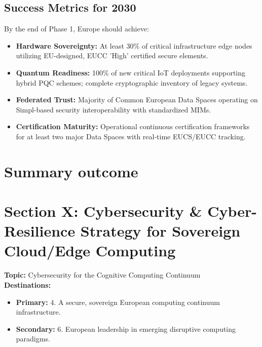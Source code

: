 \documentclass{ieeeaccess}
\begin{document}
\subsection*{Success Metrics for 2030}
By the end of Phase 1, Europe should achieve:
\begin{itemize}
    \item \textbf{Hardware Sovereignty:} At least 30\% of critical infrastructure edge nodes utilizing EU-designed, EUCC 'High' certified secure elements.
    \item \textbf{Quantum Readiness:} 100\% of new critical IoT deployments supporting hybrid PQC schemes; complete cryptographic inventory of legacy systems.
    \item \textbf{Federated Trust:} Majority of Common European Data Spaces operating on Simpl-based security interoperability with standardized MIMs.
    \item \textbf{Certification Maturity:} Operational continuous certification frameworks for at least two major Data Spaces with real-time EUCS/EUCC tracking.
\end{itemize}

\section{Summary outcome}
\section{Section X: Cybersecurity \& Cyber-Resilience Strategy for Sovereign Cloud/Edge Computing}
\noindent\textbf{Topic:} Cybersecurity for the Cognitive Computing Continuum \\
\textbf{Destinations:}
\begin{itemize}[noitemsep]
    \item \textbf{Primary:} 4. A secure, sovereign European computing continuum infrastructure.
    \item \textbf{Secondary:} 6. European leadership in emerging disruptive computing paradigms.
\end{itemize}
\end{document}
